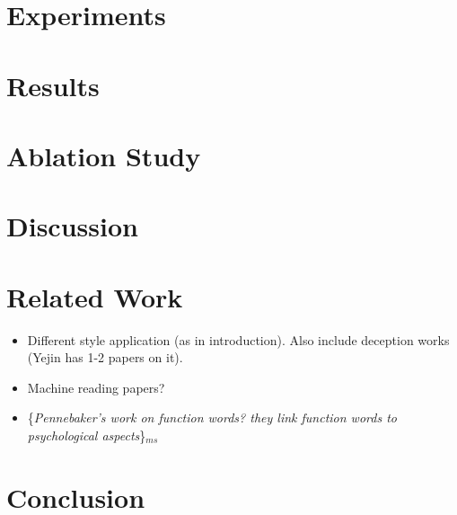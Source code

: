 \documentclass[11pt,a4paper]{article}
\newcommand{\isection}[2]{\section{#1}\label{ssec:#2}}
\newcommand{\isectionb}[1]{\section{#1}\label{ssec:#1}}
\newcommand{\ms}[1]{{\color{cyan}\{\textit{#1}\}$_{ms}$}}
\newcommand{\roy}[1]{\footnote{\color{red}{\textbf{Roy: #1}}}}
\begin{document}
\isectionb{Experiments}

\isectionb{Results}

\isection{Ablation Study}{Ablation}

\isectionb{Discussion}

\isection{Related Work}{Related}

\begin{itemize}
\item Different style application (as in introduction). Also include deception works (Yejin has 1-2 papers on it). 
\item Machine reading papers? 
\item \ms{Pennebaker's work on function words? they link function words to psychological aspects}
\end{itemize}


\isectionb{Conclusion}




%
%

\newpage


\end{document}
